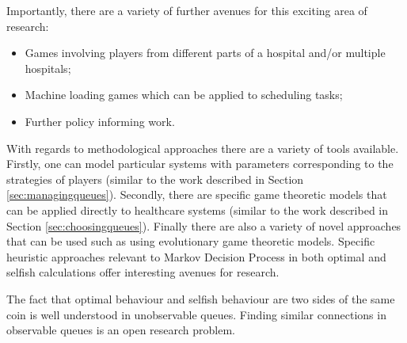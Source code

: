 \documentclass[a4paper,11pt]{article}
\begin{document}
Importantly, there are a variety of further avenues for this exciting area of research:

\begin{itemize}
    \item Games involving players from different parts of a hospital and/or multiple hospitals;
    \item Machine loading games which can be applied to scheduling tasks;
    \item Further policy informing work.
\end{itemize}

With regards to methodological approaches there are a variety of tools available.
Firstly, one can model particular systems with parameters corresponding to the strategies of players (similar to the work described in Section \ref{sec:managingqueues}).
Secondly, there are specific game theoretic models that can be applied directly to healthcare systems (similar to the work described in Section \ref{sec:choosingqueues}).
Finally there are also a variety of novel approaches that can be used such as using evolutionary game theoretic models.
Specific heuristic approaches relevant to Markov Decision Process in both optimal and selfish calculations offer interesting avenues for research.

The fact that optimal behaviour and selfish behaviour are two sides of the same coin is well understood in unobservable queues.
Finding similar connections in observable queues is an open research problem.

\newpage



%
%
%
%
%
%
\end{document}
